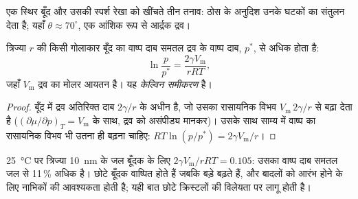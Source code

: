 \begin{omfigure}

{\small एक स्थिर बूँद और उसकी स्पर्श रेखा को खींचते तीन तनाव:
ठोस के अनुदिश उनके घटकों का संतुलन  देता है; यहाँ $\theta
\approx 70^\circ$, एक आंशिक रूप से आर्द्रक द्रव।}
\end{omfigure}

\begin{theorem}[केल्विन समीकरण]\label{thm:b3:colloids:kelvin}
त्रिज्या $r$ की किसी गोलाकार बूँद का वाष्प दाब समतल
द्रव के वाष्प दाब, $p^*$, से अधिक होता है:
\[
  \ln\frac{p}{p^*} = \frac{2\gamma V_{\mathrm m}}{rRT},
\]
जहाँ $V_{\mathrm m}$ द्रव का मोलर आयतन है। यह \emph{केल्विन
समीकरण} है।
\end{theorem}

\begin{proof}
बूँद में द्रव अतिरिक्त दाब $2\gamma/r$ के अधीन है, जो उसका
रासायनिक विभव $V_{\mathrm m}\,2\gamma/r$ से बढ़ा देता है ($(\partial\mu/\partial p)_T = V_{\mathrm m}$ के साथ, द्रव को असंपीड्य मानकर)।
उसके साथ साम्य में वाष्प का रासायनिक विभव भी
उतना ही बढ़ना चाहिए: $RT\ln(p/p^*) = 2\gamma V_{\mathrm m}/r$।
\end{proof}

\qty{25}{\celsius} पर त्रिज्या \qty{10}{nm} के जल बूँदक के लिए $2\gamma V_{\mathrm m}/rRT = 0.105$: उसका वाष्प
दाब समतल जल से 11\,\% अधिक है। छोटे बूँदक वाष्पित होते हैं जबकि
बड़े बढ़ते हैं, और बादलों को आरंभ होने के लिए नाभिकों की आवश्यकता होती है; यही बात
छोटे क्रिस्टलों की विलेयता पर लागू होती है।

